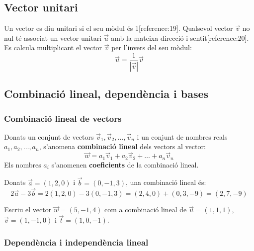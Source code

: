 \documentclass[12pt]{article}
\begin{document}
\subsection{Vector unitari}

\begin{concept}
Un vector es diu unitari si el seu mòdul és 1[reference:19]. Qualsevol vector $\vec{v}$ no nul té associat un vector unitari $\vec{u}$ amb la mateixa direcció i sentit[reference:20]. Es calcula multiplicant el vector $\vec{v}$ per l'invers del seu mòdul:
\[
\vec{u} = \frac{1}{|\vec{v}|} \vec{v}
\]
\end{concept}

\subsection{Combinació lineal, dependència i bases}

\subsubsection{Combinació lineal de vectors}

\begin{concept}
Donats un conjunt de vectors $\vec{v}_1, \vec{v}_2, \dots, \vec{v}_n$ i un conjunt de nombres reals $a_1, a_2, \dots, a_n$, s'anomena \textbf{combinació lineal} dels vectors al vector:
\[
\vec{w} = a_1\vec{v}_1 + a_2\vec{v}_2 + \dots + a_n\vec{v}_n
\]
Els nombres $a_i$ s'anomenen \textbf{coeficients} de la combinació lineal.
\end{concept}

\begin{exemple}
Donats $\vec{a} = (1, 2, 0)$ i $\vec{b} = (0, -1, 3)$, una combinació lineal és:
\[
2\vec{a} - 3\vec{b} = 2(1, 2, 0) - 3(0, -1, 3) = (2, 4, 0) + (0, 3, -9) = (2, 7, -9)
\]
\end{exemple}

\begin{exercici}
Escriu el vector $\vec{w} = (5, -1, 4)$ com a combinació lineal de $\vec{u} = (1, 1, 1)$, $\vec{v} = (1, -1, 0)$ i $\vec{t} = (1, 0, -1)$.
\end{exercici}

\subsubsection{Dependència i independència lineal}
\end{document}

